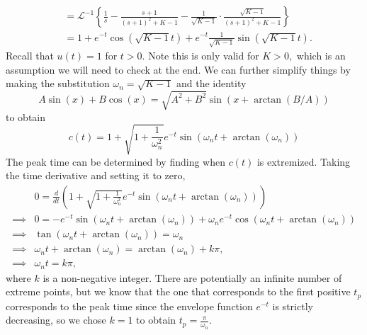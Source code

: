 \documentclass{article}
\numberwithin{equation}{section}
\begin{document}
\begin{enumerate}[label=\textbf{1.\arabic*}]
\begin{align}
        &= \mathcal{L}^{-1}\left\{\frac{1}{s} - \frac{s+1}{(s+1)^2 + K - 1} - \frac{1}{\sqrt{K-1}} \cdot \frac{\sqrt{K-1}}{(s+1)^2 + K -1}\right\} \\ 
        &= 1 + e^{-t}\cos\left(\sqrt{K-1}t\right) + e^{-t}\frac{1}{\sqrt{K-1}}\sin\left(\sqrt{K-1}t\right).
    \end{align}
    Recall that $u(t) = 1$ for $t > 0.$ Note this is only valid for $K>0,$ which is an assumption we will need to check at the end. We can further simplify things by making the substitution $\omega_n = \sqrt{K-1}$ and the identity 
    \begin{equation}
        A\sin(x)+B\cos(x) = \sqrt{A^2+B^2}\sin\left(x + \arctan(B/A)\right)
    \end{equation}
    to obtain 
    \begin{equation}
        c(t) = 1 + \sqrt{1+\frac{1}{\omega_n^2}}e^{-t}\sin\left(\omega_n t + \arctan(\omega_n)\right)
    \end{equation}
    The peak time can be determined by finding when $c(t)$ is extremized. Taking the time derivative and setting it to zero,
    \begin{align}
        &0 = \frac{d}{dt}\left(1 + \sqrt{1+\frac{1}{\omega_n^2}}e^{-t}\sin\left(\omega_n t + \arctan(\omega_n)\right)\right) \\ 
        \implies & 0 = -e^{-t}\sin(\omega_n t + \arctan(\omega_n)) + \omega_n e^{-t}\cos(\omega_n t + \arctan(\omega_n)) \\ 
        \implies &\tan(\omega_n t + \arctan(\omega_n)) = \omega_n \\ 
        \implies & \omega_n t + \arctan(\omega_n) = \arctan(\omega_n) + k\pi,\\ 
        \implies & \omega_n t = k\pi,
    \end{align}
    where $k$ is a non-negative integer. There are potentially an infinite number of extreme points, but we know that the one that corresponds to the first positive $t_p$ corresponds to the peak time since the envelope function $e^{-t}$ is strictly decreasing, so we chose $k=1$ to obtain $t_p = \frac{\pi}{\omega_n}.$
    

\end{enumerate}
\end{document}
